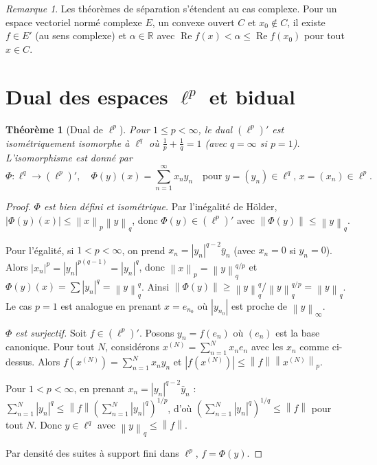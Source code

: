 \documentclass[a4paper,12pt]{book}
\newcommand{\R}{\mathbb{R}}
\newcommand{\norm}[1]{\left\| #1 \right\|}
\newcommand{\abs}[1]{\left| #1 \right|}
\theoremstyle{definition}
\theoremstyle{plain}
\newtheorem{theoreme}[definition]{Théorème}
\theoremstyle{remark}
\newtheorem{remarque}[definition]{Remarque}
\begin{document}
\begin{remarque}\label{rem:separation-complexe}
Les théorèmes de séparation s'étendent au cas complexe. Pour un espace vectoriel normé
complexe $E$, un convexe ouvert $C$ et $x_0 \notin C$, il existe $f \in E'$ (au sens
complexe) et $\alpha \in \R$ avec $\operatorname{Re} f(x) < \alpha \leq
\operatorname{Re} f(x_0)$ pour tout $x \in C$.
\end{remarque}


\section{Dual des espaces \texorpdfstring{$\ell^p$}{lp} et bidual}
\label{sec:dual-lp-bidual}


\begin{theoreme}[Dual de $\ell^p$]\label{thm:dual-lp}
Pour $1 \leq p < \infty$, le dual $(\ell^p)' $ est isométriquement isomorphe à
$\ell^q$ où $\frac{1}{p} + \frac{1}{q} = 1$ (avec $q = \infty$ si $p = 1$).
L'isomorphisme est donné par
\[
    \Phi : \ell^q \to (\ell^p)', \quad
    \Phi(y)(x) = \sum_{n=1}^{\infty} x_n y_n
    \quad \text{pour } y = (y_n) \in \ell^q,\, x = (x_n) \in \ell^p.
\]
\end{theoreme}

\begin{proof}
\emph{$\Phi$ est bien défini et isométrique.}
Par l'inégalité de Hölder,
$\abs{\Phi(y)(x)} \leq \norm{x}_p \norm{y}_q$,
donc $\Phi(y) \in (\ell^p)'$ avec $\norm{\Phi(y)} \leq \norm{y}_q$.

Pour l'égalité, si $1 < p < \infty$, on prend
$x_n = \abs{y_n}^{q-2} \bar{y}_n$ (avec $x_n = 0$ si $y_n = 0$).
Alors $\abs{x_n}^p = \abs{y_n}^{p(q-1)} = \abs{y_n}^q$, donc
$\norm{x}_p = \norm{y}_q^{q/p}$ et
$\Phi(y)(x) = \sum \abs{y_n}^q = \norm{y}_q^q$.
Ainsi $\norm{\Phi(y)} \geq \norm{y}_q^q / \norm{y}_q^{q/p} = \norm{y}_q$.
Le cas $p = 1$ est analogue en prenant $x = e_{n_0}$ où $\abs{y_{n_0}}$ est proche
de $\norm{y}_\infty$.

\emph{$\Phi$ est surjectif.}
Soit $f \in (\ell^p)'$. Posons $y_n = f(e_n)$ où $(e_n)$ est la base canonique.
Pour tout $N$, considérons $x^{(N)} = \sum_{n=1}^N x_n e_n$ avec les $x_n$ comme
ci-dessus. Alors $f(x^{(N)}) = \sum_{n=1}^N x_n y_n$ et
$\abs{f(x^{(N)})} \leq \norm{f}\norm{x^{(N)}}_p$.

Pour $1 < p < \infty$, en prenant $x_n = \abs{y_n}^{q-2}\bar{y}_n$ :
$\sum_{n=1}^N \abs{y_n}^q \leq \norm{f} \left(\sum_{n=1}^N
\abs{y_n}^q\right)^{1/p}$,
d'où $\left(\sum_{n=1}^N \abs{y_n}^q\right)^{1/q} \leq \norm{f}$ pour tout $N$.
Donc $y \in \ell^q$ avec $\norm{y}_q \leq \norm{f}$.

Par densité des suites à support fini dans $\ell^p$, $f = \Phi(y)$.
\end{proof}
\end{document}
